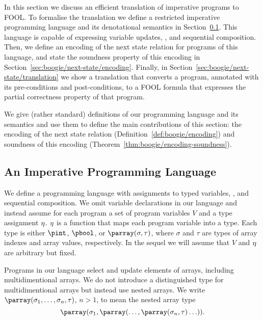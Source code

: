 In this section we discuss an efficient translation of imperative programs to FOOL. To formalise the translation we define a restricted imperative programming language and its denotational semantics in Section~\ref{sec:boogie/next-state/programming-language}. This language is capable of expressing variable updates, \ITE, and sequential composition. Then, we define an encoding of the next state relation for programs of this language, and state the soundness property of this encoding in Section~\ref{sec:boogie/next-state/encoding}. Finally, in Section~\ref{sec:boogie/next-state/translation} we show a translation that converts a program, annotated with its pre-conditions and post-conditions, to a FOOL formula that expresses the partial correctness property of that program. %

We give (rather standard) definitions of our programming language and its semantics and use them to define the main contributions of this section: the encoding of the next state relation (Definition~\ref{def:boogie/encoding}) and soundness of this encoding (Theorem~\ref{thm:boogie/encoding-soundness}).

\subsection{An Imperative Programming Language}\label{sec:boogie/next-state/programming-language}


We define a programming language with assignments to typed variables, \ITE, and sequential composition. We omit variable declarations in our language and instead assume for each program a set of program variables $V$ and a type assignment $\eta$. $\eta$ is a function that maps each program variable into a type. Each type is either $\pint$, $\pbool$, or $\parray(\sigma,\tau)$, where $\sigma$ and $\tau$ are types of array indexes and array values, respectively. In the sequel we will assume that $V$ and $\eta$ are arbitrary but fixed.

Programs in our language select and update elements of arrays, including multidimentional arrays. We do not introduce a distinguished type for multidimentional arrays but instead use nested arrays. We write $\parray(\sigma_1,\ldots,\sigma_n,\tau)$, $n > 1$, to mean the nested array type $$\parray(\sigma_1,\parray(\ldots,\parray(\sigma_n,\tau)\ldots)).$$

